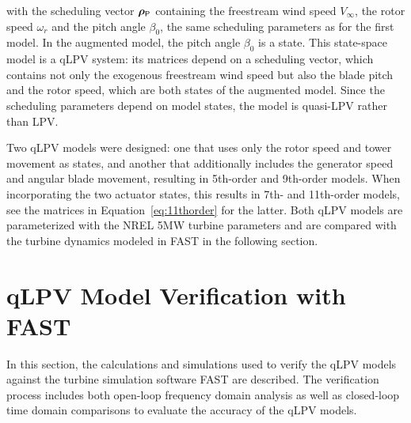     with the scheduling vector $\bm{\rho}_{\mathsf{P}}$ containing the freestream wind speed $V_\infty$, the rotor speed $\omega_r$ and the pitch angle $\beta_0$, the same scheduling parameters as for the first model. In the augmented model, the pitch angle $\beta_0$ is a state. This state-space model is a qLPV system: its matrices depend on a scheduling vector, which contains not only the exogenous freestream wind speed but also the blade pitch and the rotor speed, which are both states of the augmented model. Since the scheduling parameters depend on model states, the model is quasi-LPV rather than LPV.
    
    Two qLPV models were designed: one that uses only the rotor speed and tower movement as states, and another that additionally includes the generator speed and angular blade movement, resulting in 5th-order and 9th-order models. When incorporating the two actuator states, this results in 7th- and 11th-order models, see the matrices in Equation~\eqref{eq:11thorder} for the latter. Both qLPV models are parameterized with the NREL 5MW turbine parameters and are compared with the turbine dynamics modeled in FAST in the following section.
    \section{qLPV Model Verification with FAST} \label{sec:qLPVModelVerificationwithFAST0} 
    In this section, the calculations and simulations used to verify the qLPV models against the turbine simulation software FAST are described. The verification process includes both open-loop frequency domain analysis as well as closed-loop time domain comparisons to evaluate the accuracy of the qLPV models. 
